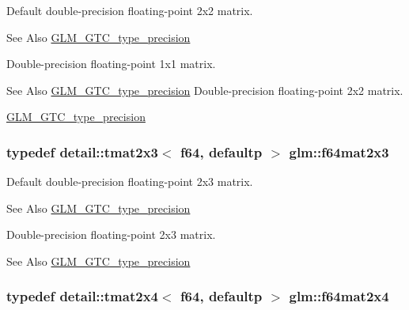 Default double-\/precision floating-\/point 2x2 matrix. \begin{DoxySeeAlso}{See Also}
\hyperlink{group__gtc__type__precision}{G\-L\-M\-\_\-\-G\-T\-C\-\_\-type\-\_\-precision}
\end{DoxySeeAlso}
Double-\/precision floating-\/point 1x1 matrix. \begin{DoxySeeAlso}{See Also}
\hyperlink{group__gtc__type__precision}{G\-L\-M\-\_\-\-G\-T\-C\-\_\-type\-\_\-precision} Double-\/precision floating-\/point 2x2 matrix. 

\hyperlink{group__gtc__type__precision}{G\-L\-M\-\_\-\-G\-T\-C\-\_\-type\-\_\-precision} 
\end{DoxySeeAlso}
\hypertarget{group__gtc__type__precision_ga5b665390818b04bdd95bb6b2a25e5c2c}{
\subsubsection[{f64mat2x3}]{\setlength{\rightskip}{0pt plus 5cm}typedef detail\-::tmat2x3$<$ f64, defaultp $>$ {\bf glm\-::f64mat2x3}}}\label{group__gtc__type__precision_ga5b665390818b04bdd95bb6b2a25e5c2c}
Default double-\/precision floating-\/point 2x3 matrix. \begin{DoxySeeAlso}{See Also}
\hyperlink{group__gtc__type__precision}{G\-L\-M\-\_\-\-G\-T\-C\-\_\-type\-\_\-precision}
\end{DoxySeeAlso}
Double-\/precision floating-\/point 2x3 matrix. \begin{DoxySeeAlso}{See Also}
\hyperlink{group__gtc__type__precision}{G\-L\-M\-\_\-\-G\-T\-C\-\_\-type\-\_\-precision} 
\end{DoxySeeAlso}
\hypertarget{group__gtc__type__precision_ga7f84d2c51081d56599a45c01d67ac155}{
\subsubsection[{f64mat2x4}]{\setlength{\rightskip}{0pt plus 5cm}typedef detail\-::tmat2x4$<$ f64, defaultp $>$ {\bf glm\-::f64mat2x4}}}\label{group__gtc__type__precision_ga7f84d2c51081d56599a45c01d67ac155}
